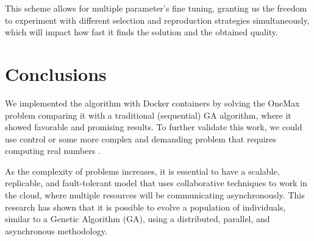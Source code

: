 \documentclass[graybox]{svmult}
\begin{document}
This scheme allows for multiple parameter's fine tuning, granting us the
freedom to experiment with different selection and reproduction strategies
simultaneously, which will impact how fast it finds the solution and the
obtained quality.


\section{Conclusions}
\label{section.conclusions}

We implemented the algorithm with Docker containers by solving the OneMax
problem comparing it with a traditional (sequential) GA algorithm, where it
showed favorable and promising results. To further validate this work, we could
use control or some more complex and demanding problem that requires computing
real numbers \cite{stanley2002evolving,miikkulainen2019evolving}.

As the complexity of problems increases, it is essential to have a scalable,
replicable, and fault-tolerant model that uses collaborative techniques to work
in the cloud, where multiple resources will be communicating asynchronously.
This research has shown that it is possible to evolve a population of
individuals, similar to a Genetic Algorithm (GA), using a distributed,
parallel, and asynchronous methodology.
\end{document}
